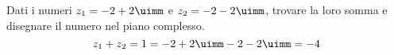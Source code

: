  	Dati i numeri $z_1=-2+2\uimm$ e $z_2=-2-2\uimm$, trovare la loro somma e  disegnare il numero nel piano complesso.
 \[z_1+z_2=1=-2+2\uimm-2-2\uimm=-4\]
 	\begin{center}
 		
 		\label{fig:disegnopianocomplesso08}
 	\end{center}
 
